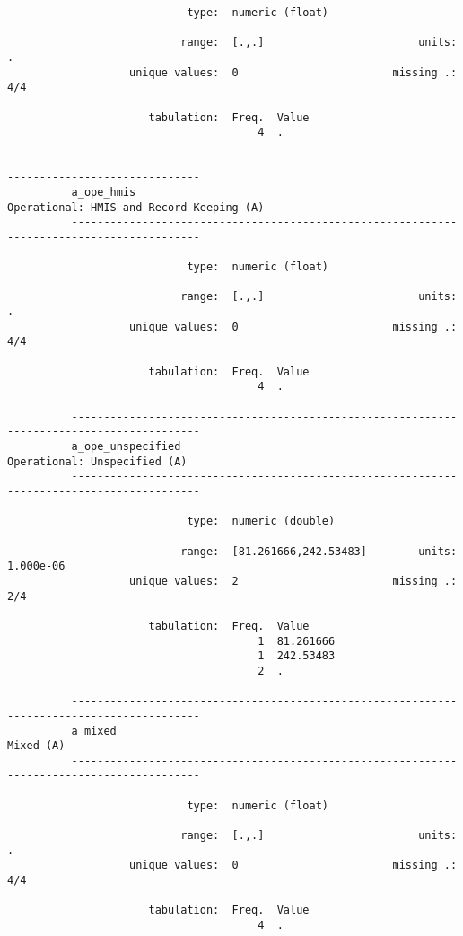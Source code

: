 \documentclass{article}
\begin{document}
\begin{verbatim}
                            type:  numeric (float)
          
                           range:  [.,.]                        units:  .
                   unique values:  0                        missing .:  4/4
          
                      tabulation:  Freq.  Value
                                       4  .
          
          ------------------------------------------------------------------------------------------
          a_ope_hmis                                        Operational: HMIS and Record-Keeping (A)
          ------------------------------------------------------------------------------------------
          
                            type:  numeric (float)
          
                           range:  [.,.]                        units:  .
                   unique values:  0                        missing .:  4/4
          
                      tabulation:  Freq.  Value
                                       4  .
          
          ------------------------------------------------------------------------------------------
          a_ope_unspecified                                             Operational: Unspecified (A)
          ------------------------------------------------------------------------------------------
          
                            type:  numeric (double)
          
                           range:  [81.261666,242.53483]        units:  1.000e-06
                   unique values:  2                        missing .:  2/4
          
                      tabulation:  Freq.  Value
                                       1  81.261666
                                       1  242.53483
                                       2  .
          
          ------------------------------------------------------------------------------------------
          a_mixed                                                                          Mixed (A)
          ------------------------------------------------------------------------------------------
          
                            type:  numeric (float)
          
                           range:  [.,.]                        units:  .
                   unique values:  0                        missing .:  4/4
          
                      tabulation:  Freq.  Value
                                       4  .
          
          
          
          
          
          
\end{verbatim}
\end{document}
